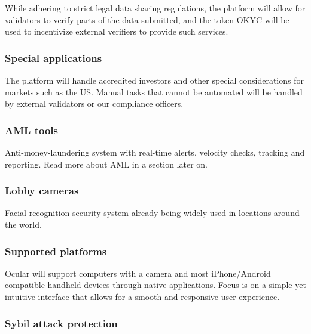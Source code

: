 \documentclass[a4paper]{article}
\begin{document}
While adhering to strict legal data sharing regulations, the platform will allow for validators to verify parts of the data submitted, and the token OKYC will be used to incentivize external verifiers to provide such services.

\subsubsection*{Special applications}
The platform will handle accredited investors and other special considerations for markets such as the US. Manual tasks that cannot be automated will be handled by external validators or our compliance officers. 

\subsubsection*{AML tools}
Anti-money-laundering system with real-time alerts, velocity checks, tracking and reporting. Read more about AML in a section later on.

\subsubsection*{Lobby cameras}
Facial recognition security system already being widely used in locations around the world.

\subsubsection*{Supported platforms}

Ocular will support computers with a camera and most iPhone/Android compatible handheld devices through native applications. Focus is on a simple yet intuitive interface that allows for a smooth and responsive user experience.

\subsubsection*{Sybil attack protection}
\end{document}
